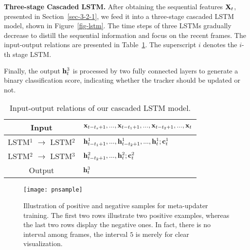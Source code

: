 \documentclass[10pt,twocolumn,letterpaper]{article}
\begin{document}
\noindent \textbf{Three-stage Cascaded LSTM.} After obtaining the sequential features
${{\bf{X}}_t}$, presented in Section~\ref{sec-3-2-1}, we feed it into a three-stage
cascaded LSTM model, shown in Figure~\ref{fig-lstm}.
The time steps of three LSTMs gradually decrease to distill the sequential information
and focus on the recent frames.
The input-output relations are presented in Table~\ref{tab:lstminout}. The superscript $i$
denotes the $i$-th stage LSTM.

Finally, the output ${\bf{h}}_t^3$ is processed by two fully connected layers to
generate a binary classification score, indicating whether the tracker should be
updated or not.

\begin{table}[t]
\caption{Input-output relations of our cascaded LSTM model. }
\label{tab:lstminout}
\small
\begin{tabular}{|c|l|}
\hline
Input             & ${{\bf{x}}_{t - {t_s} + 1}},...,{{\bf{x}}_{t - {t_1} + 1}},...,{{\bf{x}}_{t - {t_2} + 1}},...,{{\bf{x}}_t}$\\
\hline
LSTM$^1$ $\to$ LSTM$^2$  & ${\bf{h}}_{t - {t_1} + 1}^1,...,{\bf{h}}_{t - {t_2} + 1}^1,...,{\bf{h}}_t^1;{\bf{c}}_t^1$\\
\hline
LSTM$^2$ $\to$ LSTM$^3$  & ${\bf{h}}_{t - {t_2} + 1}^2,...,{\bf{h}}_t^2;{\bf{c}}_t^2$\\
\hline
Output          &${\bf{h}}_t^3$\\
\hline
\end{tabular}
\vspace{-6mm}
\end{table}

\begin{figure*}[htbp]
	\begin{center}
		\texttt{[image: pnsample]}
	\end{center}
	\vspace{-4mm}
	\caption{Illustration of positive and negative samples for meta-updater training. The first two rows illustrate
	two positive examples, whereas the last two rows display the negative ones. In fact,  there is no interval among
	frames, the interval $5$ is merely for clear visualization. }
	\label{fig-pnsample}
	\vspace{-5mm}
\end{figure*}

\vspace{-5mm}
\end{document}
